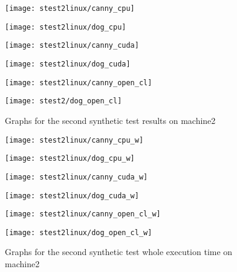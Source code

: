 \begin{figure}[H]
\centering
\begin{minipage}[t]{.49\textwidth}
\centering
\texttt{[image: stest2linux/canny\_cpu]}
\end{minipage}
\begin{minipage}[t]{.49\textwidth}
\centering
\texttt{[image: stest2linux/dog\_cpu]}
\end{minipage}
\begin{minipage}[t]{.49\textwidth}
\centering
\texttt{[image: stest2linux/canny\_cuda]}
\end{minipage}
\begin{minipage}[t]{.49\textwidth}
\centering
\texttt{[image: stest2linux/dog\_cuda]}
\end{minipage}
\begin{minipage}[t]{.49\textwidth}
\centering
\texttt{[image: stest2linux/canny\_open\_cl]}
\end{minipage}
\begin{minipage}[t]{.49\textwidth}
\centering
\texttt{[image: stest2/dog\_open\_cl]}
\end{minipage}
\caption{Graphs for the second synthetic test results on machine2}
\label{fig:test2sl}
\end{figure}

\begin{figure}[H]
\centering
\begin{minipage}[t]{.49\textwidth}
\centering
\texttt{[image: stest2linux/canny\_cpu\_w]}
\end{minipage}
\begin{minipage}[t]{.49\textwidth}
\centering
\texttt{[image: stest2linux/dog\_cpu\_w]}
\end{minipage}
\begin{minipage}[t]{.49\textwidth}
\centering
\texttt{[image: stest2linux/canny\_cuda\_w]}
\end{minipage}
\begin{minipage}[t]{.49\textwidth}
\centering
\texttt{[image: stest2linux/dog\_cuda\_w]}
\end{minipage}
\begin{minipage}[t]{.49\textwidth}
\centering
\texttt{[image: stest2linux/canny\_open\_cl\_w]}
\end{minipage}
\begin{minipage}[t]{.49\textwidth}
\centering
\texttt{[image: stest2linux/dog\_open\_cl\_w]}
\end{minipage}
\caption{Graphs for the second synthetic test whole execution time on machine2}
\label{fig:test2swl}
\end{figure}

